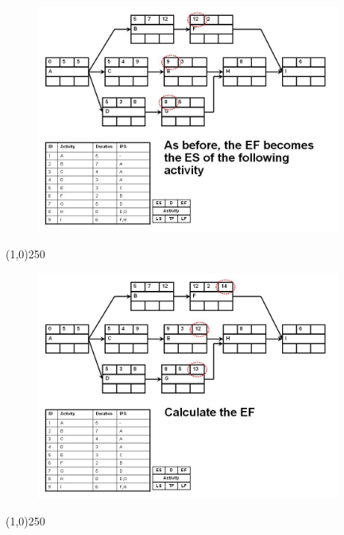 \begin{frame}
\begin{figure}
	\centering
		\includegraphics[width = 10.0cm]{oldnotes/Slide144.jpg}
\end{figure}
\end{frame}
\begin{center}\line(1,0){250}\end{center}




\begin{frame}
\begin{figure}
	\centering
		\includegraphics[width = 10.0cm]{oldnotes/Slide145.jpg}
\end{figure}
\end{frame}
\begin{center}\line(1,0){250}\end{center}




